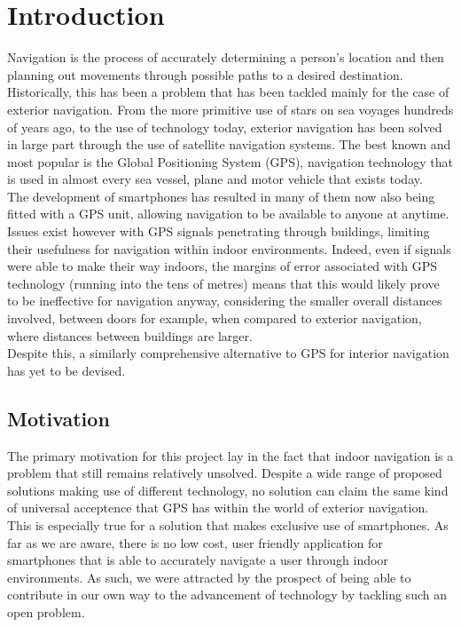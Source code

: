 \documentclass[main.tex]{subfiles}
\begin{document}
\chapter{Introduction}

Navigation is the process of accurately determining a person's location and then planning out movements through possible paths to a desired destination. Historically, this has been a problem that has been tackled mainly for the case of exterior navigation. From the more primitive use of stars on sea voyages hundreds of years ago, to the use of technology today, exterior navigation has been solved in large part through the use of satellite navigation systems. The best known and most popular is the Global Positioning System (GPS), navigation technology that is used in almost every sea vessel, plane and motor vehicle that exists today.\\

The development of smartphones has resulted in many of them now also being fitted with a GPS unit, allowing navigation to be available to anyone at anytime. Issues exist however with GPS signals penetrating through buildings, limiting their usefulness for navigation within indoor environments. Indeed, even if signals were able to make their way indoors, the margins of error associated with GPS technology (running into the tens of metres) means that this would likely prove to be ineffective for navigation anyway, considering the smaller overall distances involved, between doors for example, when compared to exterior navigation, where distances between buildings are larger.\\

Despite this, a similarly comprehensive alternative to GPS for interior navigation has yet to be devised.

\section{Motivation}

The primary motivation for this project lay in the fact that indoor navigation is a problem that still remains relatively unsolved. Despite a wide range of proposed solutions making use of different technology, no solution can claim the same kind of universal acceptence that GPS has within the world of exterior navigation. This is especially true for a solution that makes exclusive use of smartphones. As far as we are aware, there is no low cost, user friendly application for smartphones that is able to accurately navigate a user through indoor environments. As such, we were attracted by the prospect of being able to contribute in our own way to the advancement of technology by tackling such an open problem.\\
\end{document}
